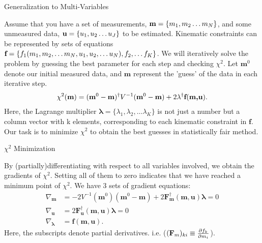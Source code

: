 \documentclass[
	xcolor=dvipsnames,
	10pt, 
	]{beamer}
\begin{document}
\begin{frame}{Generalization to Multi-Variables}
	\begin{block}{}
		Assume that you have a set of measurements, $\textbf m =\{m_1,m_2\ldots m_N\}$, and some unmeasured data, $\textbf u =\{u_1,u_2\ldots u_J\}$ to be estimated. Kinematic constraints can be represented by sets of equations $\textbf f =\{f_1(m_1,m_2,\ldots m_N,u_1,u_2,\ldots u_N),f_2,\ldots f_K\}$. We will iteratively solve the problem by guessing the best parameter for each step and checking  $\chi^2$.  Let $\mathbf m^0$ denote our initial measured data, and $\mathbf m$ represent the 'guess' of the data in each iterative step.
		\vspace{-2 mm}
		\begin{align}
			\chi^2(\textbf{m}) = (\textbf{m}^0-\textbf{m})^\dagger V^{-1}(\textbf{m}^0-\textbf{m})+2\mathbf\lambda^\dagger \textbf f(\textbf{m,u}).\label{KFChi2}
		\end{align}
		Here, the Lagrange multiplier $\mathbf \lambda =\{\lambda_1,\lambda_2,\ldots\lambda_K\}$ is not just a number but a column vector with k elements, corresponding to each kinematic constraint in $\mathbf f$. Our task is to minimize $\chi^2$ to obtain the best guesses in statistically fair method.	
	\end{block}
\end{frame}
\begin{frame}{$\chi^2$ Minimization}
	\begin{block}{}
		By (partially)differentiating with respect to all variables involved, we obtain the gradients of $\chi^2$. Setting all of them to zero indicates that we have reached a minimum point of $\chi^2$. We have 3 sets of gradient equations:
		\begin{align}
			\nabla_{\mathbf m} &= -2 V^{-1}(\mathbf m^0)(\mathbf m^0-\mathbf m) + 2 \mathbf F_\mathbf m^\dagger(\mathbf{m,u})\mathbf\lambda=0\label{GradM}\\
			\nabla_{\mathbf u} &= 2\mathbf F_\mathbf u^\dagger(\mathbf{m,u})\mathbf \lambda =0\label{GradU}\\
			\nabla_{\mathbf \lambda}& = \mathbf f(\mathbf{m,u})\label{GradL}.
		\end{align}
		Here, the subscripts denote partial derivatives. i.e. ($(\mathbf {F}_m)_{ki}\equiv\frac{\partial f_k}{\partial m_i}$).
	\end{block}
\end{frame}
\end{document}
